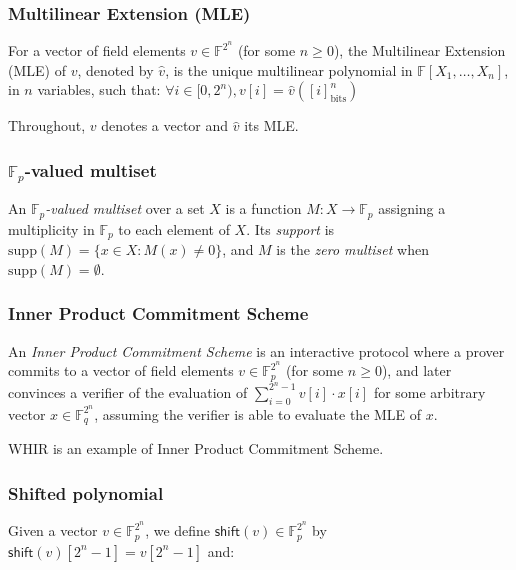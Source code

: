 \documentclass{article}
\theoremstyle{definition}
\newcommand{\Fp}{\mathbb F_p}
\newcommand{\Fq}{\mathbb F_q}
\begin{document}
\subsubsection{Multilinear Extension (MLE)}

For a vector of field elements $v \in \mathbb F^{2^n}$ (for some $n \geq 0$), the Multilinear Extension (MLE) of $v$, denoted by $\hat{v}$, is the unique multilinear polynomial in $\mathbb F[X_1, \dots, X_n]$, in $n$ variables, such that: $\forall i \in [0, 2^n), v[i] = \hat{v}([i]_\text{bits}^n)$

Throughout, $v$ denotes a vector and $\hat{v}$ its MLE.

\vspace{5mm}

\subsubsection{$\Fp$-valued multiset}\label{sec:fp-multiset}

An \emph{$\Fp$-valued multiset} over a set $X$ is a function $M : X \to \Fp$ assigning a multiplicity in $\Fp$ to each element of $X$. Its \emph{support} is $\mathrm{supp}(M) = \{x \in X : M(x) \neq 0\}$, and $M$ is the \emph{zero multiset} when $\mathrm{supp}(M) = \emptyset$.

\vspace{5mm}

\subsubsection{Inner Product Commitment Scheme}\label{sec:inner_product_PCS}

An \textit{Inner Product Commitment Scheme} is an interactive protocol where a prover commits to a vector of field elements $v \in \Fp^{2^n}$ (for some $n \geq 0$), and later convinces a verifier of the evaluation of $\sum_{i = 0}^{2^n - 1} v[i] \cdot x[i]$ for some arbitrary vector $x \in \Fq^{2^n}$, assuming the verifier is able to evaluate the MLE of $x$.

WHIR \cite{whir} is an example of Inner Product Commitment Scheme.


\vspace{5mm}

\subsubsection{Shifted polynomial}\label{sec:shifts}

Given a vector $v \in \Fp^{2^n}$, we define $\mathsf{shift}(v)  \in \Fp^{2^n}$ by $\mathsf{shift}(v)[2^n - 1] = v[2^n - 1]$ and:
\end{document}
